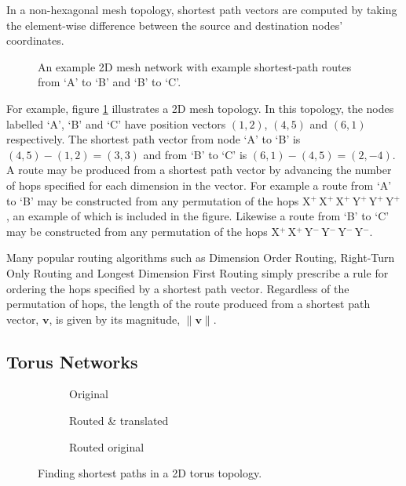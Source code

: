 		In a non-hexagonal mesh topology, shortest path vectors are computed by
		taking the element-wise difference between the source and destination
		nodes' coordinates.
		
		\begin{figure}
			\center
			\caption{An example 2D mesh network with example shortest-path routes
			from `A' to `B' and `B' to `C'.}
			\label{fig:mesh-topology-coordinates}
		\end{figure}
		
		For example, figure \ref{fig:mesh-topology-coordinates} illustrates a 2D
		mesh topology. In this topology, the nodes labelled `A', `B' and `C' have
		position vectors $(1, 2)$, $(4, 5)$ and $(6, 1)$ respectively. The shortest
		path vector from node `A' to `B' is $(4, 5) - (1, 2) = (3, 3)$ and from `B'
		to `C' is $(6, 1) - (4, 5) = (2, -4)$. A route may be produced from a
		shortest path vector by advancing the number of hops specified for each
		dimension in the vector. For example a route from `A' to `B' may be
		constructed from any permutation of the hops
		X$^+\,$X$^+\,$X$^+\,$Y$^+\,$Y$^+\,$Y$^+$, an example of which is included
		in the figure. Likewise a route from `B' to `C' may be constructed from any
		permutation of the hops X$^+\,$X$^+\,$Y$^-\,$Y$^-\,$Y$^-\,$Y$^-$.
		
		Many popular routing algorithms such as Dimension Order Routing, Right-Turn
		Only Routing and Longest Dimension First Routing \cite{dally04,davies12}
		simply prescribe a rule for ordering the hops specified by a shortest path
		vector. Regardless of the permutation of hops, the length of the route
		produced from a shortest path vector, $\mathbf{v}$, is given by its
		magnitude, $\|\mathbf{v}\|$.
		
		\subsection{Torus Networks}
			
			\begin{figure}
				\center
				\begin{subfigure}{0.3\linewidth}
					\center
					\caption{Original}
					\label{fig:torus-shortest-path-example}
				\end{subfigure}
				\begin{subfigure}{0.3\linewidth}
					\center
					\caption{Routed \& translated}
					\label{fig:torus-shortest-path-translate}
				\end{subfigure}
				\begin{subfigure}{0.3\linewidth}
					\center
					\caption{Routed original}
					\label{fig:torus-shortest-path-routed}
				\end{subfigure}
				
				\caption{Finding shortest paths in a 2D torus topology.}
				\label{fig:torus-shortest-path}
			\end{figure}
			
